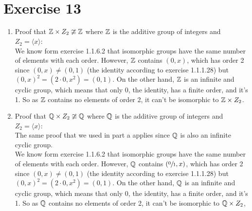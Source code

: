 \documentclass[12pt]{article}
\begin{document}
    \section*{Exercise 13}
    \begin{enumerate}[label=\textbf{\alph*.}]
        \item 
            Proof that $\mathbb{Z} \times Z_2 \ncong \mathbb{Z}$
            where $\mathbb{Z}$ is the additive group of integers
            and $Z_2 = \langle x \rangle$: \\
            We know form exercise 1.1.6.2 that isomorphic
            groups have the same number of elements with each order.
            However, $\mathbb{Z}$ contains $(0, x)$, which has order 2
            since $(0, x) \neq (0, 1)$
            (the identity according to exercise 1.1.1.28)
            but $(0, x)^2 = (2 \cdot 0, x^2) = (0, 1)$.
            On the other hand, $\mathbb{Z}$ is an infinite and cyclic
            group, which means that only 0, the identity,
            has a finite order, and it's 1.
            So as $\mathbb{Z}$ contains no elements of order 2,
            it can't be isomorphic to $\mathbb{Z} \times Z_2$.
        \item
            Proof that $\mathbb{Q} \times Z_2 \ncong \mathbb{Q}$
            where $\mathbb{Q}$ is the additive group of integers
            and $Z_2 = \langle x \rangle$: \\
            The same proof that we used in part a applies
            since $\mathbb{Q}$ is also an infinite cyclic group. \\
            We know form exercise 1.1.6.2 that isomorphic
            groups have the same number of elements with each order.
            However, $\mathbb{Q}$ contains $(\sfrac{0}{1}, x)$,
            which has order 2
            since $(0, x) \neq (0, 1)$
            (the identity according to exercise 1.1.1.28)
            but $(0, x)^2 = (2 \cdot 0, x^2) = (0, 1)$.
            On the other hand, $\mathbb{Q}$ is an infinite and cyclic
            group, which means that only 0, the identity,
            has a finite order, and it's 1.
            So as $\mathbb{Q}$ contains no elements of order 2,
            it can't be isomorphic to $\mathbb{Q} \times Z_2$,
    \end{enumerate}
\end{document}
